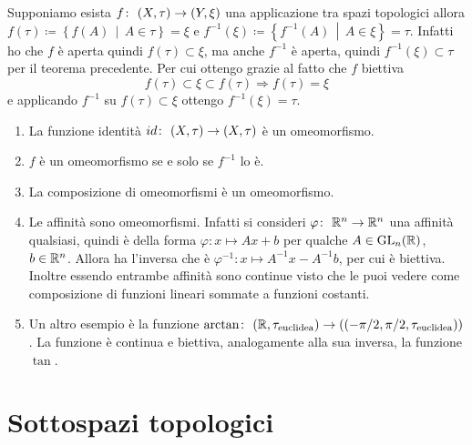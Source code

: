 \begin{remark}
	Supponiamo esista $f \colon\ (X,\tau) \rightarrow (Y,\xi)$ una applicazione tra spazi topologici allora $f(\tau) \coloneqq \left\{ f(A) \,\middle|\,  A \in \tau\right\} = \xi$ e $f^{-1}(\xi) \coloneqq \left\{ f^{-1}(A) \,\middle|\,  A \in \xi\right\} = \tau$. Infatti ho che $f$ è aperta quindi $f(\tau) \subset \xi$, ma anche $f^{-1}$ è aperta, quindi $f^{-1}(\xi) \subset \tau$ per il teorema precedente. Per cui ottengo grazie al fatto che $f$ biettiva
	\begin{equation*}
		f(\tau) \subset \xi \subset f(\tau) \Longrightarrow f(\tau) = \xi
	\end{equation*} 
	e applicando $f^{-1}$ su $f(\tau) \subset \xi$ ottengo $f^{-1}(\xi) = \tau$.
\end{remark}

\begin{example}
\begin{enumerate}
	\item La funzione identità $id \colon\ (X,\tau) \rightarrow (X,\tau)$ è un omeomorfismo. 
	\item $f$ è un omeomorfismo se e solo se $f^{-1}$ lo è. 
	\item La composizione di omeomorfismi è un omeomorfismo.
	\item Le affinità sono omeomorfismi. Infatti si consideri $\varphi \colon\ \mathbb{R}^n \rightarrow \mathbb{R}^n$ una affinità qualsiasi, quindi è della forma $\varphi \colon x \mapsto Ax + b$ per qualche $A \in \operatorname{GL}_n(\mathbb{R})$, $b \in \mathbb{R}^n$. Allora ha l'inversa che è $\varphi^{-1} \colon x \mapsto A^{-1}x - A^{-1}b$, per cui è biettiva. Inoltre essendo entrambe affinità sono continue visto che le puoi vedere come composizione di funzioni lineari sommate a funzioni costanti.
	\item Un altro esempio è la funzione $\arctan \colon\ (\mathbb{R}, \tau_{\text{euclidea}}) \rightarrow ((-\pi/2,\pi/2, \tau_{\text{euclidea}}))$. La funzione è continua e biettiva, analogamente alla sua inversa, la funzione $\tan$.
\end{enumerate}
\end{example}

\section{Sottospazi topologici}

